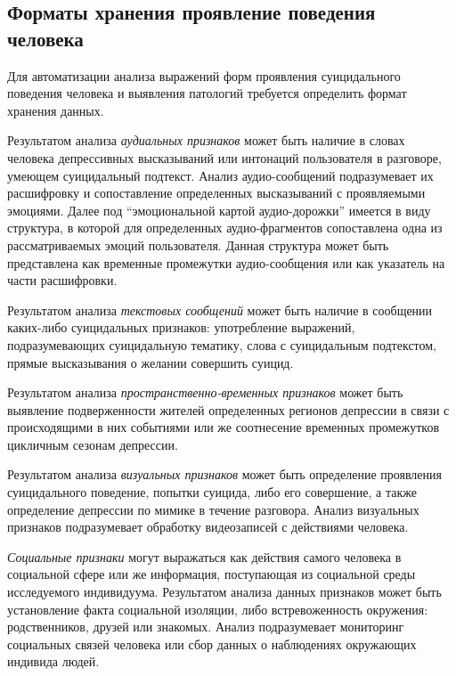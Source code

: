 \subsection{Форматы хранения проявление поведения человека}

Для автоматизации анализа выражений форм проявления суицидального поведения человека и выявления патологий требуется определить формат хранения данных.

Результатом анализа \textit{аудиальных признаков} может быть наличие в словах человека депрессивных высказываний или интонаций пользователя в разговоре, умеющем суицидальный подтекст. Анализ аудио-сообщений подразумевает их расшифровку и сопоставление определенных высказываний с проявляемыми эмоциями. Далее под ``эмоциональной картой аудио-дорожки'' имеется в виду структура, в которой для определенных аудио-фрагментов сопоставлена одна из рассматриваемых эмоций пользователя. Данная структура может быть представлена как временные промежутки аудио-сообщения или как указатель на части расшифровки. 

Результатом анализа  \textit{текстовых сообщений} может быть наличие в сообщении каких-либо суицидальных признаков: употребление выражений, подразумевающих суицидальную тематику, слова с суицидальным подтекстом, прямые высказывания о желании совершить суицид.

Результатом анализа \textit{пространственно-временных признаков} может быть выявление подверженности жителей определенных регионов депрессии в связи с происходящими в них событиями или же соотнесение временных промежутков цикличным сезонам депрессии.

Результатом анализа \textit{визуальных признаков} может быть определение проявления суицидального поведение, попытки суицида, либо его совершение, а также определение депрессии по мимике в течение разговора. Анализ визуальных признаков подразумевает обработку видеозаписей с действиями человека.

\textit{Социальные признаки} могут выражаться как действия самого человека в социальной сфере или же информация, поступающая из социальной среды исследуемого индивидуума. Результатом анализа данных признаков может быть установление факта социальной изоляции, либо встревоженность окружения: родственников, друзей или знакомых. Анализ подразумевает мониторинг социальных связей человека или сбор данных о наблюдениях окружающих индивида людей.


